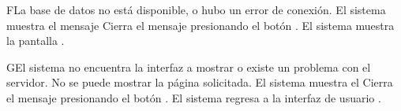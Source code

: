 
\begin{UCtrayectoriaA}{F}{La base de datos no está disponible, o hubo un error de conexión.}
	\UCpaso El sistema muestra el mensaje 
	\UCpaso[\UCactor] Cierra el mensaje presionando el botón .
	\UCpaso  El sistema muestra la pantalla  .
\end{UCtrayectoriaA}


\begin{UCtrayectoriaA}{G}{El sistema no encuentra la interfaz a mostrar o existe un problema con el servidor.}
	\UCpaso No se puede mostrar la página solicitada.
	\UCpaso El sistema muestra el 
	\UCpaso[\UCactor] Cierra el mensaje presionando el botón .
	\UCpaso El sistema regresa a la interfaz de usuario .
\end{UCtrayectoriaA}



